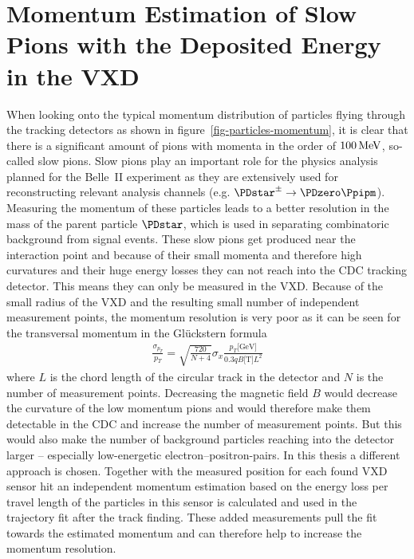 \newcommand{\dedx}{$\mathrm d E / \mathrm d x$ }
\chapter[Momentum Estimation of Slow Pions with the Deposited Energy\\in the VXD]{Momentum Estimation of Slow Pions with the Deposited Energy in the VXD} \label{chapter-vxd}

When looking onto the typical momentum distribution of particles flying through the tracking detectors as shown in figure~\ref{fig-particles-momentum}, it is clear that there is a significant amount of pions with momenta in the order of $\unit[100]{MeV}$, so-called slow pions. Slow pions play an important role for the physics analysis planned for the Belle~II experiment as they are extensively used for reconstructing relevant analysis channels (e.g. $\PDstar^\pm \to \PDzero \Ppipm$). Measuring the momentum of these particles leads to a better resolution in the mass of the parent particle $\PDstar$, which is used in separating combinatoric background from signal events. These slow pions get produced near the interaction point and because of their small momenta and therefore high curvatures and their huge energy losses they can not reach into the CDC tracking detector. This means they can only be measured in the VXD. Because of the small radius of the VXD and the resulting small number of independent measurement points, the momentum resolution is very poor as it can be seen for the transversal momentum in the Glückstern formula
\begin{align*}
 \frac{\sigma_{p_T}}{p_T} = \sqrt{\frac{720}{N + 4}} \sigma_x \frac{p_T \text{[GeV]}}{0.3 q B \text{[T]} L^2}
\end{align*}
where $L$ is the chord length of the circular track in the detector and $N$ is the number of measurement points. Decreasing the magnetic field $B$ would decrease the curvature of the low momentum pions and would therefore make them detectable in the CDC and increase the number of measurement points. But this would also make the number of background particles reaching into the detector larger -- especially low-energetic electron--positron-pairs. In this thesis a different approach is chosen. Together with the measured position for each found VXD sensor hit an independent momentum estimation based on the energy loss per travel length of the particles in this sensor is calculated and used in the trajectory fit after the track finding. These added measurements pull the fit towards the estimated momentum and can therefore help to increase the momentum resolution.

